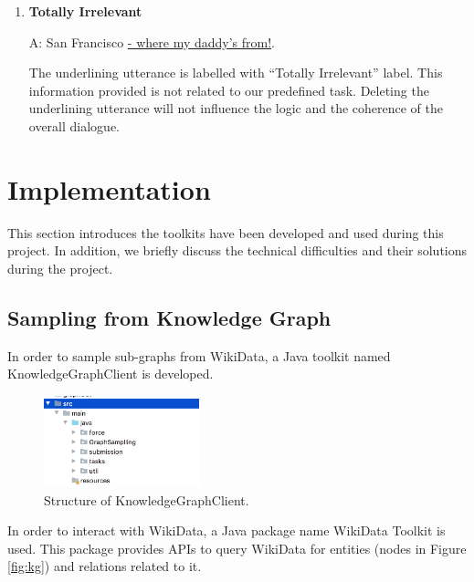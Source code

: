 \documentclass[bsc,frontabs,twoside,singlespacing,parskip,deptreport]{infthesis}     %
\begin{document}
\begin{enumerate}
\item \textbf{Totally Irrelevant}

\begin{exe}
	\ex
		\begin{xlist}
			\ex \label{ccq1} A: San Francisco \underline{- where my daddy's from!}.
\end{xlist}
\end{exe}


The underlining utterance is labelled with ``Totally Irrelevant” label. This information provided is not related to our predefined task. Deleting the underlining utterance will not influence the logic and the coherence of the overall dialogue.

\end{enumerate}




\section{Implementation}

This section introduces the toolkits have been developed and used during this project. In addition, we briefly discuss the technical difficulties and their solutions during the project.

\subsection{Sampling from Knowledge Graph}

In order to sample sub-graphs from WikiData, a Java toolkit named KnowledgeGraphClient is developed.

\begin{figure}[h]
    \centering
    \includegraphics[width=0.4\textwidth]{client.png}
    \caption{Structure of KnowledgeGraphClient.}
    \label{fig:client}
\end{figure}

In order to interact with WikiData, a Java package name WikiData Toolkit \cite{wikitoolkit} is used. This package provides APIs to query WikiData for entities (nodes in Figure \ref{fig:kg}) and relations related to it.
\end{document}
